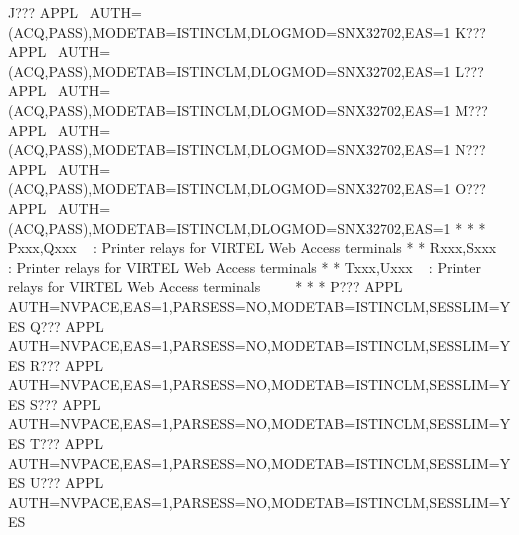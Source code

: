 \documentclass[letterpaper,10pt,english]{sphinxmanual}
\begin{document}
\begin{sphinxVerbatim}[commandchars=\\\{\}]
J??? APPL  AUTH=(ACQ,PASS),MODETAB=ISTINCLM,DLOGMOD=SNX32702,EAS=1
K??? APPL  AUTH=(ACQ,PASS),MODETAB=ISTINCLM,DLOGMOD=SNX32702,EAS=1
L??? APPL  AUTH=(ACQ,PASS),MODETAB=ISTINCLM,DLOGMOD=SNX32702,EAS=1
M??? APPL  AUTH=(ACQ,PASS),MODETAB=ISTINCLM,DLOGMOD=SNX32702,EAS=1
N??? APPL  AUTH=(ACQ,PASS),MODETAB=ISTINCLM,DLOGMOD=SNX32702,EAS=1
O??? APPL  AUTH=(ACQ,PASS),MODETAB=ISTINCLM,DLOGMOD=SNX32702,EAS=1
* \PYGZhy{}\PYGZhy{}\PYGZhy{}\PYGZhy{}\PYGZhy{}\PYGZhy{}\PYGZhy{}\PYGZhy{}\PYGZhy{}\PYGZhy{}\PYGZhy{}\PYGZhy{}\PYGZhy{}\PYGZhy{}\PYGZhy{}\PYGZhy{}\PYGZhy{}\PYGZhy{}\PYGZhy{}\PYGZhy{}\PYGZhy{}\PYGZhy{}\PYGZhy{}\PYGZhy{}\PYGZhy{}\PYGZhy{}\PYGZhy{}\PYGZhy{}\PYGZhy{}\PYGZhy{}\PYGZhy{}\PYGZhy{}\PYGZhy{}\PYGZhy{}\PYGZhy{}\PYGZhy{}\PYGZhy{}\PYGZhy{}\PYGZhy{}\PYGZhy{}\PYGZhy{}\PYGZhy{}\PYGZhy{}\PYGZhy{}\PYGZhy{}\PYGZhy{}\PYGZhy{}\PYGZhy{}\PYGZhy{}\PYGZhy{}\PYGZhy{}\PYGZhy{}\PYGZhy{}\PYGZhy{}\PYGZhy{}\PYGZhy{}\PYGZhy{}\PYGZhy{}\PYGZhy{}\PYGZhy{}\PYGZhy{}\PYGZhy{}\PYGZhy{}\PYGZhy{}\PYGZhy{}\PYGZhy{}*
* Pxxx,Qxxx   : Printer relays for VIRTEL Web Access terminals      *
* Rxxx,Sxxx   : Printer relays for VIRTEL Web Access terminals      *
* Txxx,Uxxx   : Printer relays for VIRTEL Web Access terminals      *
* \PYGZhy{}\PYGZhy{}\PYGZhy{}\PYGZhy{}\PYGZhy{}\PYGZhy{}\PYGZhy{}\PYGZhy{}\PYGZhy{}\PYGZhy{}\PYGZhy{}\PYGZhy{}\PYGZhy{}\PYGZhy{}\PYGZhy{}\PYGZhy{}\PYGZhy{}\PYGZhy{}\PYGZhy{}\PYGZhy{}\PYGZhy{}\PYGZhy{}\PYGZhy{}\PYGZhy{}\PYGZhy{}\PYGZhy{}\PYGZhy{}\PYGZhy{}\PYGZhy{}\PYGZhy{}\PYGZhy{}\PYGZhy{}\PYGZhy{}\PYGZhy{}\PYGZhy{}\PYGZhy{}\PYGZhy{}\PYGZhy{}\PYGZhy{}\PYGZhy{}\PYGZhy{}\PYGZhy{}\PYGZhy{}\PYGZhy{}\PYGZhy{}\PYGZhy{}\PYGZhy{}\PYGZhy{}\PYGZhy{}\PYGZhy{}\PYGZhy{}\PYGZhy{}\PYGZhy{}\PYGZhy{}\PYGZhy{}\PYGZhy{}\PYGZhy{}\PYGZhy{}\PYGZhy{}\PYGZhy{}\PYGZhy{}\PYGZhy{}\PYGZhy{}\PYGZhy{}\PYGZhy{}\PYGZhy{}*
P??? APPL AUTH=NVPACE,EAS=1,PARSESS=NO,MODETAB=ISTINCLM,SESSLIM=YES
Q??? APPL AUTH=NVPACE,EAS=1,PARSESS=NO,MODETAB=ISTINCLM,SESSLIM=YES
R??? APPL AUTH=NVPACE,EAS=1,PARSESS=NO,MODETAB=ISTINCLM,SESSLIM=YES
S??? APPL AUTH=NVPACE,EAS=1,PARSESS=NO,MODETAB=ISTINCLM,SESSLIM=YES
T??? APPL AUTH=NVPACE,EAS=1,PARSESS=NO,MODETAB=ISTINCLM,SESSLIM=YES
U??? APPL AUTH=NVPACE,EAS=1,PARSESS=NO,MODETAB=ISTINCLM,SESSLIM=YES
\end{sphinxVerbatim}

\newpage

\end{document}
